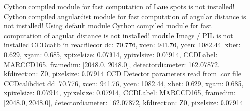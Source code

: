 \documentclass[letterpaper,10pt,english]{sphinxmanual}
\begin{document}
%
\begin{sphinxVerbatim}[commandchars=\\\{\}]
Cython compiled module for fast computation of Laue spots is not installed!
Cython compiled \PYGZsq{}angulardist\PYGZsq{} module for fast computation of angular distance is not installed!
Using default module
Cython compiled module for fast computation of angular distance is not installed!
module Image / PIL is not installed
CCDcalib in readfile\PYGZus{}cor \PYGZob{}\PYGZsq{}dd\PYGZsq{}: 70.776, \PYGZsq{}xcen\PYGZsq{}: 941.76, \PYGZsq{}ycen\PYGZsq{}: 1082.44, \PYGZsq{}xbet\PYGZsq{}: 0.629, \PYGZsq{}xgam\PYGZsq{}: \PYGZhy{}0.685, \PYGZsq{}xpixelsize\PYGZsq{}: 0.07914, \PYGZsq{}ypixelsize\PYGZsq{}: 0.07914, \PYGZsq{}CCDLabel\PYGZsq{}: \PYGZsq{}MARCCD165\PYGZsq{}, \PYGZsq{}framedim\PYGZsq{}: [2048.0, 2048.0], \PYGZsq{}detectordiameter\PYGZsq{}: 162.07872, \PYGZsq{}kf\PYGZus{}direction\PYGZsq{}: \PYGZsq{}Z\PYGZgt{}0\PYGZsq{}, \PYGZsq{}pixelsize\PYGZsq{}: 0.07914\PYGZcb{}
CCD Detector parameters read from .cor file
CCDcalibdict \PYGZob{}\PYGZsq{}dd\PYGZsq{}: 70.776, \PYGZsq{}xcen\PYGZsq{}: 941.76, \PYGZsq{}ycen\PYGZsq{}: 1082.44, \PYGZsq{}xbet\PYGZsq{}: 0.629, \PYGZsq{}xgam\PYGZsq{}: \PYGZhy{}0.685, \PYGZsq{}xpixelsize\PYGZsq{}: 0.07914, \PYGZsq{}ypixelsize\PYGZsq{}: 0.07914, \PYGZsq{}CCDLabel\PYGZsq{}: \PYGZsq{}MARCCD165\PYGZsq{}, \PYGZsq{}framedim\PYGZsq{}: [2048.0, 2048.0], \PYGZsq{}detectordiameter\PYGZsq{}: 162.07872, \PYGZsq{}kf\PYGZus{}direction\PYGZsq{}: \PYGZsq{}Z\PYGZgt{}0\PYGZsq{}, \PYGZsq{}pixelsize\PYGZsq{}: 0.07914\PYGZcb{}
\end{sphinxVerbatim}

%
\begin{sphinxVerbatim}[commandchars=\\\{\}]
\end{sphinxVerbatim}

%
\begin{sphinxVerbatim}[commandchars=\\\{\}]
\PYG{p}{[}\PYG{p}{]}
\end{sphinxVerbatim}
\end{document}
